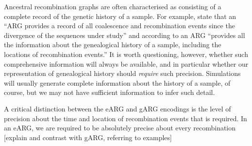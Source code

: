 \documentclass{article}
\begin{document}
Ancestral recombination graphs are often characterised
as consisting of a complete record of the genetic history
of a sample. For example,
\cite{rasmussen2014genome} state that an ``ARG provides a record of all
coalescence and recombination events since the divergence of the sequences
under study'' and
according to \cite{deng2021distribution} an ARG
``provides all the information about the genealogical history of a sample,
including the locations of recombination events.'' It is worth
questioning, however, whether such comprehensive information
will always be available, and in particular whether our
representation of genealogical history should \emph{require}
such precision. Simulations will usually generate complete
information about the history of a sample, of course, but
we may not have sufficient information to infer such detail.

A critical distinction between the eARG and gARG encodings
is the level of precision about the time and location of
recombination events that is required. In an eARG, we are
required to be absolutely precise about every recombination
[explain and contrast with gARG, referring to examples]





\end{document}
